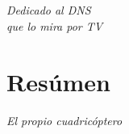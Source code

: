 \documentclass[main]{subfiles}
\begin{document}
\chapter*{}
\begin{flushright}
\textit{
Dedicado al DNS \\
que lo mira por TV
}
\end{flushright}

\chapter*{Res\'umen}
\begin{flushright}
\textit{El propio cuadric\'optero
}
\end{flushright}
\end{document}
